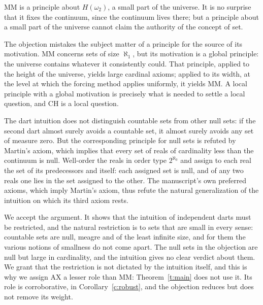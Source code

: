 \documentclass{situationist-preprint}
\begin{document}
\begin{objection}
MM is a principle about $H(\omega_2)$, a small part of the universe. It is no surprise that it fixes the continuum, since the continuum lives there; but a principle about a small part of the universe cannot claim the authority of the concept of set.
\end{objection}

\begin{reply}
The objection mistakes the subject matter of a principle for the source of its motivation. MM concerns sets of size $\aleph_1$, but its motivation is a global principle: the universe contains whatever it consistently could. That principle, applied to the height of the universe, yields large cardinal axioms; applied to its width, at the level at which the forcing method applies uniformly, it yields MM. A local principle with a global motivation is precisely what is needed to settle a local question, and CH is a local question.
\end{reply}

\begin{objection}
The dart intuition does not distinguish countable sets from other null sets: if the second dart almost surely avoids a countable set, it almost surely avoids any set of measure zero. But the corresponding principle for null sets is refuted by Martin's axiom, which implies that every set of reals of cardinality less than the continuum is null. Well-order the reals in order type $2^{\aleph_0}$ and assign to each real the set of its predecessors and itself: each assigned set is null, and of any two reals one lies in the set assigned to the other. The manuscript's own preferred axioms, which imply Martin's axiom, thus refute the natural generalization of the intuition on which its third axiom rests.
\end{objection}

\begin{reply}
We accept the argument. It shows that the intuition of independent darts must be restricted, and the natural restriction is to sets that are small in every sense: countable sets are null, meagre and of the least infinite size, and for them the various notions of smallness do not come apart. The null sets in the objection are null but large in cardinality, and the intuition gives no clear verdict about them. We grant that the restriction is not dictated by the intuition itself, and this is why we assign AX a lesser role than MM: Theorem~\ref{t:main} does not use it. Its role is corroborative, in Corollary~\ref{c:robust}, and the objection reduces but does not remove its weight.
\end{reply}
\end{document}
